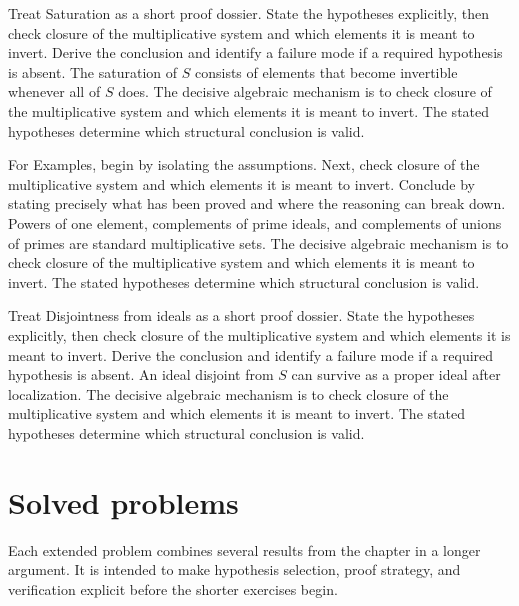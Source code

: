 \begin{example}\label{ex:v05-worked-02}
Treat Saturation as a short proof dossier. State the hypotheses explicitly, then check closure of the multiplicative system and which elements it is meant to invert. Derive the conclusion and identify a failure mode if a required hypothesis is absent. The saturation of $S$ consists of elements that become invertible whenever all of $S$ does. The decisive algebraic mechanism is to check closure of the multiplicative system and which elements it is meant to invert. The stated hypotheses determine which structural conclusion is valid.
\end{example}

\begin{example}\label{ex:v05-worked-03}
For Examples, begin by isolating the assumptions. Next, check closure of the multiplicative system and which elements it is meant to invert. Conclude by stating precisely what has been proved and where the reasoning can break down. Powers of one element, complements of prime ideals, and complements of unions of primes are standard multiplicative sets. The decisive algebraic mechanism is to check closure of the multiplicative system and which elements it is meant to invert. The stated hypotheses determine which structural conclusion is valid.
\end{example}

\begin{example}\label{ex:v05-worked-04}
Treat Disjointness from ideals as a short proof dossier. State the hypotheses explicitly, then check closure of the multiplicative system and which elements it is meant to invert. Derive the conclusion and identify a failure mode if a required hypothesis is absent. An ideal disjoint from $S$ can survive as a proper ideal after localization. The decisive algebraic mechanism is to check closure of the multiplicative system and which elements it is meant to invert. The stated hypotheses determine which structural conclusion is valid.
\end{example}

\section{Solved problems}
Each extended problem combines several results from the chapter in a longer argument. It is intended to make hypothesis selection, proof strategy, and verification explicit before the shorter exercises begin.

